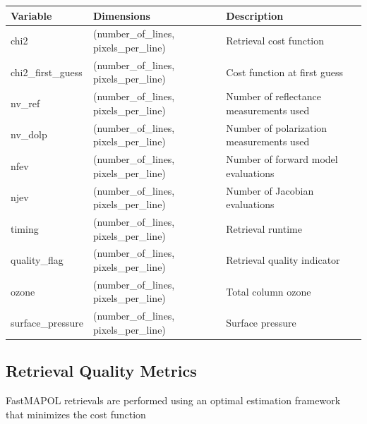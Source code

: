 \documentclass[
  letterpaper,
]{scrbook}
\begin{document}
\begin{longtable}[]{@{}
  >{\raggedright\arraybackslash}p{}
  >{\raggedright\arraybackslash}p{}
  >{\raggedright\arraybackslash}p{}@{}}
\toprule\noalign{}
\begin{minipage}[b]{\linewidth}\raggedright
Variable
\end{minipage} & \begin{minipage}[b]{\linewidth}\raggedright
Dimensions
\end{minipage} & \begin{minipage}[b]{\linewidth}\raggedright
Description
\end{minipage} \\
\midrule\noalign{}
\endhead
\bottomrule\noalign{}
\endlastfoot
chi2 & (number\_of\_lines, pixels\_per\_line) & Retrieval cost
function \\
chi2\_first\_guess & (number\_of\_lines, pixels\_per\_line) & Cost
function at first guess \\
nv\_ref & (number\_of\_lines, pixels\_per\_line) & Number of reflectance
measurements used \\
nv\_dolp & (number\_of\_lines, pixels\_per\_line) & Number of
polarization measurements used \\
nfev & (number\_of\_lines, pixels\_per\_line) & Number of forward model
evaluations \\
njev & (number\_of\_lines, pixels\_per\_line) & Number of Jacobian
evaluations \\
timing & (number\_of\_lines, pixels\_per\_line) & Retrieval runtime \\
quality\_flag & (number\_of\_lines, pixels\_per\_line) & Retrieval
quality indicator \\
ozone & (number\_of\_lines, pixels\_per\_line) & Total column ozone \\
surface\_pressure & (number\_of\_lines, pixels\_per\_line) & Surface
pressure \\
\end{longtable}

\subsection{Retrieval Quality Metrics}\label{retrieval-quality-metrics}

FastMAPOL retrievals are performed using an optimal estimation framework
that minimizes the cost function
\end{document}

